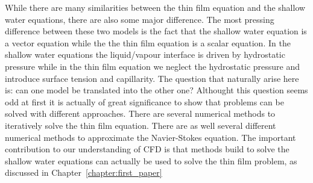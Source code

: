 While there are many similarities between the thin film equation and the shallow water equations, there are also some major difference.
The most pressing difference between these two models is the fact that the shallow water equation is a vector equation while the the thin film equation is a scalar equation.
In the shallow water equations the liquid/vapour interface is driven by hydrostatic pressure while in the thin film equation we neglect the hydrostatic pressure and introduce surface tension and capillarity.
The question that naturally arise here is: can one model be translated into the other one?
Althought this question seems odd at first it is actually of great significance to show that problems can be solved with different approaches.
There are several numerical methods to iteratively solve the thin film equation.
There are as well several different numerical methods to approximate the Navier-Stokes equation.
The important contribution to our understanding of CFD is that methods build to solve the shallow water equations can actually be used to solve the thin film problem, as discussed in Chapter~\ref{chapter:first_paper}